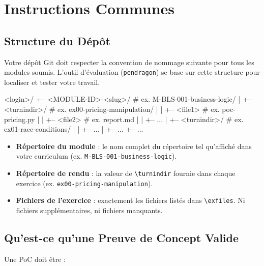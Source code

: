 \chapter{Instructions Communes}

\section{Structure du D\'ep\^ot}

Votre d\'ep\^ot Git doit respecter la convention de nommage suivante pour
tous les modules soumis. L'outil d'\'evaluation (\texttt{pendragon})
se base sur cette structure pour localiser et tester votre travail.

\begin{console}
<login>/
+-- <MODULE-ID>-<slug>/         # ex. M-BLS-001-business-logic/
|   +-- <turnindir>/            # ex. ex00-pricing-manipulation/
|   |   +-- <file1>             # ex. poc-pricing.py
|   |   +-- <file2>             # ex. report.md
|   |   +-- ...
|   +-- <turnindir>/            # ex. ex01-race-conditions/
|   |   +-- ...
|   +-- ...
+-- ...
\end{console}

\begin{itemize}
  \item \textbf{R\'epertoire du module} : le nom complet du r\'epertoire tel
        qu'affich\'e dans votre curriculum (ex. \texttt{M-BLS-001-business-logic}).
  \item \textbf{R\'epertoire de rendu} : la valeur de \texttt{\textbackslash turnindir}
        fournie dans chaque exercice (ex. \texttt{ex00-pricing-manipulation}).
  \item \textbf{Fichiers de l'exercice} : exactement les fichiers list\'es dans
        \texttt{\textbackslash exfiles}. Ni fichiers suppl\'ementaires, ni fichiers manquants.
\end{itemize}

\section{Qu'est-ce qu'une Preuve de Concept Valide}

Une PoC doit \^etre :

